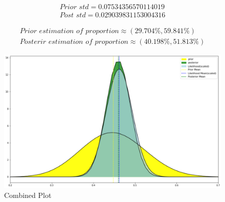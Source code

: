 \documentclass[journal,12pt,twocolumn]{IEEEtran}
\begin{document}
        \begin{align*}
        \textit{Prior std} = 0.07534356570114019\\
        \textit{Post std} = 0.029039831153004316
        \end{align*}

        \begin{align*}
        \textit{Prior estimation of proportion} \approx \left (29.704\%, 59.841\% \right )\\
        \textit{Posterir estimation of proportion} \approx \left (40.198\%, 51.813\% \right )
        \end{align*}
\begin{figure}[!ht]
\centering
\includegraphics[width=\columnwidth]{Images/Final_Comb_Plot.png}
\caption{Combined Plot}
\label{fig:yndft}
\end{figure}
\begin{center}     \href{https://colab.research.google.com/drive/1AMuKl883Mes_bpji0VLkH9uxfi8i9bwj?usp=sharing}{}
\end{center}
\end{document}

